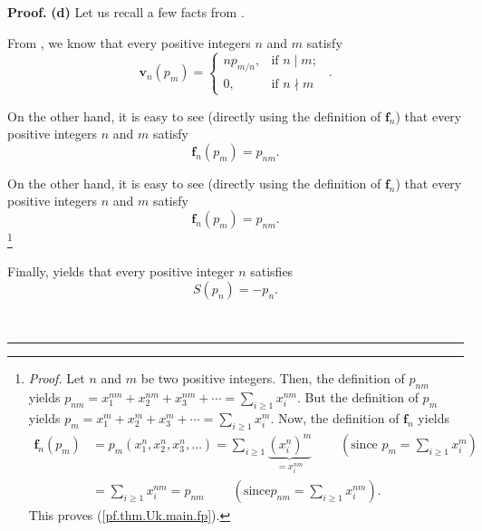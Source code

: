\documentclass[numbers=enddot,12pt,final,onecolumn,notitlepage]{scrartcl}%
\theoremstyle{definition}
\newenvironment{proof}[1][Proof]{\noindent\textbf{#1.} }{\ \rule{0.5em}{0.5em}}
\let\sumnonlimits\sum
\renewcommand{\sum}{\sumnonlimits\limits}
\newenvironment{verlong}{}{}
\newenvironment{vershort}{}{}
\begin{document}
\begin{proof}
\textbf{(d)} Let us recall a few facts from \cite{GriRei}.

From \cite[Exercise 2.9.10(a)]{GriRei}, we know that every positive integers
$n$ and $m$ satisfy%
\begin{equation}
\mathbf{v}_{n}\left(  p_{m}\right)  =%
\begin{cases}
np_{m/n}, & \text{if }n\mid m;\\
0, & \text{if }n\nmid m
\end{cases}
\ \ . \label{pf.thm.Uk.main.vp}%
\end{equation}


\begin{vershort}
On the other hand, it is easy to see (directly using the definition of
$\mathbf{f}_{n}$) that every positive integers $n$ and $m$ satisfy%
\begin{equation}
\mathbf{f}_{n}\left(  p_{m}\right)  =p_{nm}. \label{pf.thm.Uk.main.short.fp}%
\end{equation}

\end{vershort}

\begin{verlong}
On the other hand, it is easy to see (directly using the definition of
$\mathbf{f}_{n}$) that every positive integers $n$ and $m$ satisfy%
\begin{equation}
\mathbf{f}_{n}\left(  p_{m}\right)  =p_{nm}. \label{pf.thm.Uk.main.fp}%
\end{equation}
\footnote{\textit{Proof.} Let $n$ and $m$ be two positive integers. Then, the
definition of $p_{nm}$ yields $p_{nm}=x_{1}^{nm}+x_{2}^{nm}+x_{3}^{nm}%
+\cdots=\sum_{i\geq1}x_{i}^{nm}$. But the definition of $p_{m}$ yields
$p_{m}=x_{1}^{m}+x_{2}^{m}+x_{3}^{m}+\cdots=\sum_{i\geq1}x_{i}^{m}$. Now, the
definition of $\mathbf{f}_{n}$ yields%
\begin{align*}
\mathbf{f}_{n}\left(  p_{m}\right)   &  =p_{m}\left(  x_{1}^{n},x_{2}%
^{n},x_{3}^{n},\ldots\right)  =\sum_{i\geq1}\underbrace{\left(  x_{i}%
^{n}\right)  ^{m}}_{=x_{i}^{nm}}\ \ \ \ \ \ \ \ \ \ \left(  \text{since }%
p_{m}=\sum_{i\geq1}x_{i}^{m}\right) \\
&  =\sum_{i\geq1}x_{i}^{nm}=p_{nm}\ \ \ \ \ \ \ \ \ \ \left(  \text{since
}p_{nm}=\sum_{i\geq1}x_{i}^{nm}\right)  .
\end{align*}
This proves (\ref{pf.thm.Uk.main.fp}).}
\end{verlong}

Finally, \cite[Proposition 2.4.1(i)]{GriRei} yields that every positive
integer $n$ satisfies%
\begin{equation}
S\left(  p_{n}\right)  =-p_{n}. \label{pf.thm.Uk.main.Sp}%
\end{equation}



\end{proof}
\end{document}
